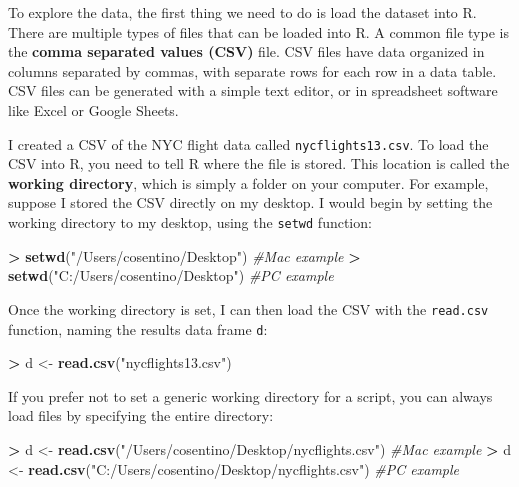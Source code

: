 \documentclass[
]{book}
\newenvironment{Shaded}{\begin{snugshade}}{\end{snugshade}}
\newcommand{\CommentTok}[1]{\textcolor[rgb]{0.56,0.35,0.01}{\textit{#1}}}
\newcommand{\FunctionTok}[1]{\textcolor[rgb]{0.13,0.29,0.53}{\textbf{#1}}}
\newcommand{\NormalTok}[1]{#1}
\newcommand{\OtherTok}[1]{\textcolor[rgb]{0.56,0.35,0.01}{#1}}
\newcommand{\SpecialCharTok}[1]{\textcolor[rgb]{0.81,0.36,0.00}{\textbf{#1}}}
\newcommand{\StringTok}[1]{\textcolor[rgb]{0.31,0.60,0.02}{#1}}
\begin{document}
To explore the data, the first thing we need to do is load the dataset into R. There are multiple types of files that can be loaded into R. A common file type is the \textbf{comma separated values (CSV)} file. CSV files have data organized in columns separated by commas, with separate rows for each row in a data table. CSV files can be generated with a simple text editor, or in spreadsheet software like Excel or Google Sheets.

I created a CSV of the NYC flight data called \texttt{nycflights13.csv}. To load the CSV into R, you need to tell R where the file is stored. This location is called the \textbf{working directory}, which is simply a folder on your computer. For example, suppose I stored the CSV directly on my desktop. I would begin by setting the working directory to my desktop, using the \texttt{setwd} function:

\begin{Shaded}
\begin{Highlighting}[]
\SpecialCharTok{\textgreater{}} \FunctionTok{setwd}\NormalTok{(}\StringTok{"/Users/cosentino/Desktop"}\NormalTok{)   }\CommentTok{\#Mac example}
\SpecialCharTok{\textgreater{}} \FunctionTok{setwd}\NormalTok{(}\StringTok{"C:/Users/cosentino/Desktop"}\NormalTok{) }\CommentTok{\#PC example}
\end{Highlighting}
\end{Shaded}

Once the working directory is set, I can then load the CSV with the \texttt{read.csv} function, naming the results data frame \texttt{d}:

\begin{Shaded}
\begin{Highlighting}[]
\SpecialCharTok{\textgreater{}}\NormalTok{ d }\OtherTok{\textless{}{-}} \FunctionTok{read.csv}\NormalTok{(}\StringTok{"nycflights13.csv"}\NormalTok{)}
\end{Highlighting}
\end{Shaded}

If you prefer not to set a generic working directory for a script, you can always load files by specifying the entire directory:

\begin{Shaded}
\begin{Highlighting}[]
\SpecialCharTok{\textgreater{}}\NormalTok{ d }\OtherTok{\textless{}{-}} \FunctionTok{read.csv}\NormalTok{(}\StringTok{"/Users/cosentino/Desktop/nycflights.csv"}\NormalTok{)   }\CommentTok{\#Mac example}
\SpecialCharTok{\textgreater{}}\NormalTok{ d }\OtherTok{\textless{}{-}} \FunctionTok{read.csv}\NormalTok{(}\StringTok{"C:/Users/cosentino/Desktop/nycflights.csv"}\NormalTok{) }\CommentTok{\#PC example}
\end{Highlighting}
\end{Shaded}
\end{document}

